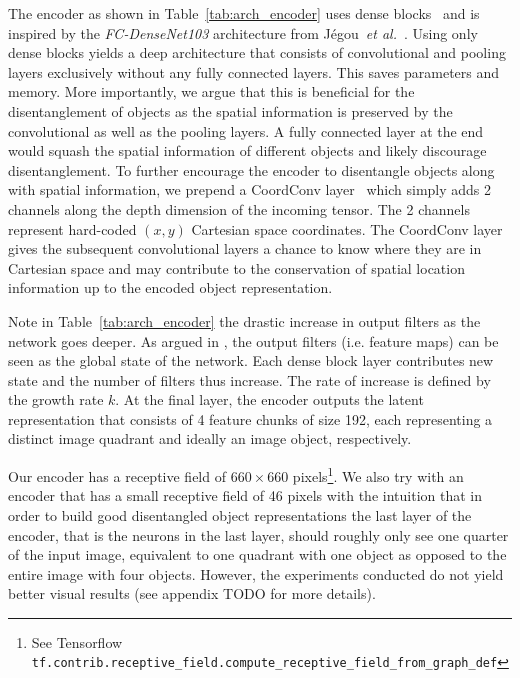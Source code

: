 \documentclass[12pt,a4paper]{article}
\begin{document}
The encoder as shown in Table~\ref{tab:arch_encoder} uses dense blocks~\cite{DenseNet} and is inspired by the \textit{FC-DenseNet103} architecture from Jégou~\textit{et al.}~\cite{Tiramisu}. Using only dense blocks yields a deep architecture that consists of convolutional and pooling layers exclusively without any fully connected layers. This saves parameters and memory. More importantly, we argue that this is beneficial for the disentanglement of objects as the spatial information is preserved by the convolutional as well as the pooling layers. A fully connected layer at the end would squash the spatial information of different objects and likely discourage disentanglement. To further encourage the encoder to disentangle objects along with spatial information, we prepend a CoordConv layer~\cite{CoordConv} which simply adds 2 channels along the depth dimension of the incoming tensor. The 2 channels represent hard-coded $(x,y)$ Cartesian space coordinates. The CoordConv layer gives the subsequent convolutional layers a chance to know where they are in Cartesian space and may contribute to the conservation of spatial location information up to the encoded object representation. 

Note in Table~\ref{tab:arch_encoder} the drastic increase in output filters as the network goes deeper. As argued in \cite{DenseNet}, the output filters (i.e. feature maps) can be seen as the global state of the network. Each dense block layer contributes new state and the number of filters thus increase. The rate of increase is defined by the growth rate $k$. At the final layer, the encoder outputs the latent representation that consists of 4 feature chunks of size 192, each representing a distinct image quadrant and ideally an image object, respectively.

Our encoder has a receptive field of $660 \times 660$ pixels\footnote{See Tensorflow \texttt{tf.contrib.receptive\_field.compute\_receptive\_field\_from\_graph\_def}}. We also try with an encoder that has a small receptive field of 46 pixels with the intuition that in order to build good disentangled object representations the last layer of the encoder, that is the neurons in the last layer, should roughly only see one quarter of the input image, equivalent to one quadrant with one object as opposed to the entire image with four objects. However, the experiments conducted do not yield better visual results (see appendix TODO for more details).
\end{document}
